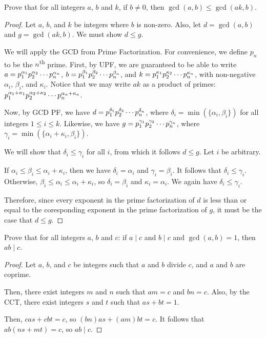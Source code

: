 \begin{recommended}
  Prove that for all integers $a$, $b$ and $k$, if $b \neq 0$, then $\gcd(a, b) \leq \gcd(ak, b)$.
\end{recommended}
\begin{proof}
  Let $a$, $b$, and $k$ be integers where $b$ is non-zero.
  Also, let $d=\gcd(a,b)$ and $g=\gcd(ak,b)$. We must show $d \leq g$.

  We will apply the GCD from Prime Factorization.
  For convenience, we define $p_n$ to be the $n$\textsuperscript{th} prime.
  First, by UPF, we are guaranteed to be able to write
  $a=\pf{\alpha_#1}{n}$, $b=\pf{\beta_#1}{n}$, and $k=\pf{\kappa_#1}{n}$,
  with non-negative $\alpha_i$, $\beta_i$, and $\kappa_i$.
  Notice that we may write $ak$ as a product of primes: $\pf{\alpha_#1+\kappa_#1}{n}$.

  Now, by GCD PF, we have $d=\pf{\delta_#1}{n}$, where $\delta_i=\min(\{\alpha_i,\beta_i\})$
  for all integers $1 \leq i \leq k$.
  Likewise, we have $g=\pf{\gamma_#1}{n}$, where $\gamma_i=\min(\{\alpha_i+\kappa_i,\beta_i\})$.

  We will show that $\delta_i \leq \gamma_i$ for all $i$, from which it follows $d \leq g$.
  Let $i$ be arbitrary.

  If $\alpha_i \leq \beta_i \leq \alpha_i+\kappa_i$,
  then we have $\delta_i = \alpha_i$ and $\gamma_i = \beta_i$.
  It follows that $\delta_i\leq\gamma_i$.
  Otherwise, $\beta_i \leq \alpha_i \leq \alpha_i + \kappa_i$,
  so $\delta_i = \beta_i$ and $\kappa_i = \alpha_i$.
  We again have $\delta_i\leq\gamma_i$.

  Therefore, since every exponent in the prime factorization of $d$ is less than or equal to
  the coresponding exponent in the prime factorization of $g$, it must be the case that $d \leq g$.
\end{proof}


\begin{recommended}
  Prove that for all integers $a$, $b$ and $c$:
  if $a \mid c$ and $b \mid c$ and $\gcd(a, b) = 1$, then $ab \mid c$.
\end{recommended}
\begin{proof}
  Let $a$, $b$, and $c$ be integers such that $a$ and $b$ divide $c$, and $a$ and $b$ are coprime.

  Then, there exist integers $m$ and $n$ such that $am=c$ and $bn=c$.
  Also, by the CCT, there exist integers $s$ and $t$ such that $as+bt=1$.

  Then, $cas+cbt=c$, so $(bn)as+(am)bt=c$.
  It follows that $ab(ns+mt)=c$, so $ab \mid c$.
\end{proof}



